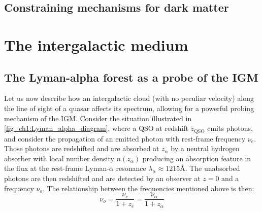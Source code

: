 \subsection{Constraining mechanisms for dark matter}



\section{The intergalactic medium}

\subsection{The Lyman-alpha forest as a probe of the IGM}

Let us now describe how an intergalactic cloud (with no peculiar velocity) along the line of sight of a quasar affects its spectrum, allowing for a powerful probing mechanism of the IGM. Consider the situation illustrated in \cref{fig_ch1:Lyman_alpha_diagram}, where a QSO at redshift $z_\text{QSO}$ emits photons, and consider the propagation of an emitted photon with rest-frame frequency $\nu_e$. Those photons are redshifted and are absorbed at $z_\alpha$ by a neutral hydrogen absorber with local number density $n(z_\alpha)$ producing an absorption feature in the flux at the rest-frame Lyman-$\alpha$ resonance $\lambda_\alpha \approx 1215$\r{A}. The unabsorbed photons are then redshifted and are detected by an observer at $z=0$ and a frequency $\nu_o$. The relationship between the frequencies mentioned above is then:
\begin{equation}
    \nu_o=\frac{\nu_e}{1+z_e}=\frac{\nu_\alpha}{1+z_\alpha} 
\end{equation}


